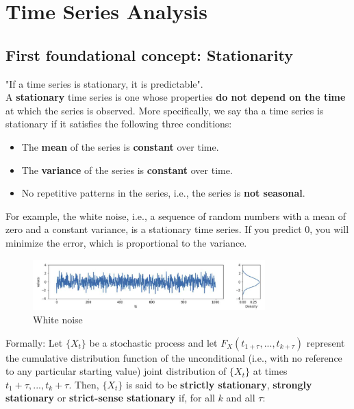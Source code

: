 \chapter{Time Series Analysis}

\section{First foundational concept: Stationarity}

"If a time series is stationary, it is predictable".\\

A \textbf{stationary} time series is one whose properties \textbf{do not depend on 
the time} at which the series is observed. More specifically, we say tha a time series 
is stationary if it satisfies the following three conditions:
\begin{itemize}
    \item The \textbf{mean} of the series is \textbf{constant} over time.
    \item The \textbf{variance} of the series is \textbf{constant} over time.
    \item No repetitive patterns in the series, i.e., the series is \textbf{not
    seasonal}.
\end{itemize}

For example, the white noise, i.e., a sequence of random numbers with a mean of
zero and a constant variance, is a stationary time series. If you predict 0, 
you will minimize the error, which is proportional to the variance.\\

\begin{figure}[H]
    \centering
    \includegraphics[width=0.8\textwidth]{figures/white_noise.png}
    \caption{White noise}
    \label{fig:white_noise}
\end{figure}

Formally: Let $\{X_t\}$ be a stochastic process and let $F_X(t_{1+ \tau}, ..., t_{k+ \tau})$
represent the cumulative distribution function of the unconditional (i.e., with no 
reference to any particular starting value) joint distribution of $\{X_t\}$ at times
$t_1 + \tau, ..., t_k + \tau$. Then, $\{X_t\}$ is said to be \textbf{strictly 
stationary}, \textbf{strongly stationary} or \textbf{strict-sense stationary}
if, for all $k$ and all $\tau$:

